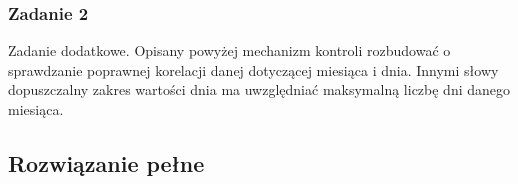 \documentclass[a4paper,12pt]{extarticle}  %
\begin{document}
\subsubsection{Zadanie 2}
Zadanie dodatkowe. Opisany powyżej mechanizm kontroli rozbudować o sprawdzanie poprawnej korelacji
danej dotyczącej miesiąca i dnia. Innymi słowy dopuszczalny zakres wartości dnia ma uwzględniać maksymalną
liczbę dni danego miesiąca.
\subsection{Rozwiązanie pełne}


% 
\end{document}
